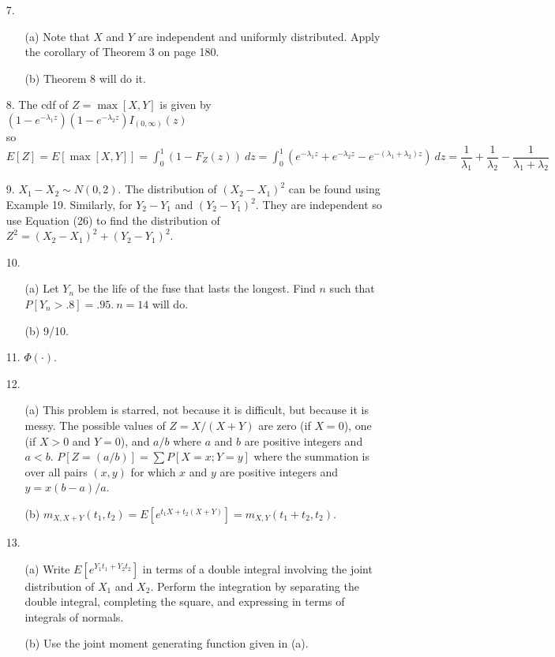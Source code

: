 \begin{enumerate}
	\item[7.] \begin{enumerate}
		\item[(a)] Note that $X$ and $Y$ are independent and uniformly distributed. Apply the corollary of Theorem 3 on page 180.
		\item[(b)] Theorem 8 will do it.
	\end{enumerate}
	
	\item[8.] The cdf of $Z=\max[X,Y]$ is given by \\
			$(1-e^{-\lambda_1z})(1-e^{-\lambda_2z})I_{(0,\infty)}(z)$ \\
			so $\displaystyle E[Z] = E[\max[X,Y]] = \int_0^1 (1-F_Z(z))\ dz = \int_{0}^{1} \left(e^{-\lambda_1z}+e^{-\lambda_2z}-e^{-(\lambda_1+\lambda_2)z}\right)\ dz = \dfrac{1}{\lambda_1} + \dfrac{1}{\lambda_2} - \dfrac{1}{\lambda_1+\lambda_2}$ 
			
	\item[9.] $X_1-X_2\sim N(0,2)$. The distribution of $(X_2-X_1)^2$ can be found using Example 19.  Similarly, for $Y_2-Y_1$ and $(Y_2-Y_1)^2$.   They are independent so use Equation (26) to find the distribution of $Z^2 = (X_2-X_1)^2 + (Y_2-Y_1)^2$.
	
	\item[10.] \begin{enumerate}
		\item[(a)] Let $Y_n$ be the life of the fuse that lasts the longest. Find $n$ such that $P[Y_n> .8]=.95.\ n=14$ will do.
		\item[(b)] 9/10.
	\end{enumerate}
	
	\item[11.] $\Phi(\cdot)$.
	
	\item[12.] \begin{enumerate}
		\item[(a)] This problem is starred, not because it is difficult, but because it is messy. The possible values of $Z=X/(X+Y)$ are zero (if $X=0$), one (if $X>0$ and $Y=0$), and $a/b$ where $a$ and $b$ are positive integers and $a<b$. $P[Z = (a/b)] = \sum P[X=x; Y=y]$ where the summation is over all pairs $(x,y)$ for which $x$ and $y$ are positive integers and $y=x(b-a)/a$.
		\item[(b)] $m_{X,X+Y}(t_1,t_2) = E[e^{t_1X+t_2(X+Y)}] = m_{X,Y}(t_1+t_2, t_2).$
	\end{enumerate}

	\item[13.] \begin{enumerate}
		\item[(a)] Write $E[e^{Y_1t_1+Y_2t_2}]$ in terms of a double integral involving the joint distribution of $X_1$ and $X_2$. Perform the integration by separating the double integral, completing the square, and expressing in terms of integrals of normals.
		\item[(b)] Use the joint moment generating function given in (a).
	\end{enumerate}
	

\end{enumerate}
